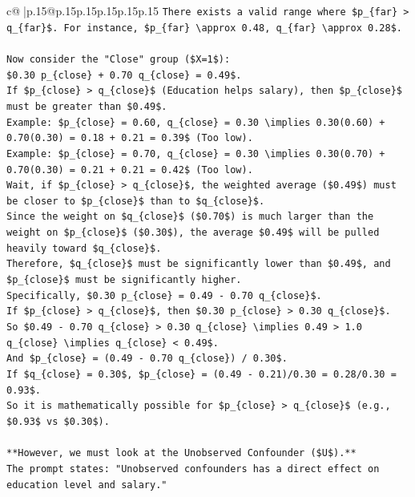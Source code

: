 \documentclass{article}
\begin{document}
{\begin{supertabular}{c@{$\;$}|p{.15\linewidth}@{}p{.15\linewidth}p{.15\linewidth}p{.15\linewidth}p{.15\linewidth}p{.15\linewidth}}
{{{\texttt{There exists a valid range where \$p\_\{far\} > q\_\{far\}\$. For instance, \$p\_\{far\} \textbackslash{}approx 0.48, q\_\{far\} \textbackslash{}approx 0.28\$.} \\
\\ 
\texttt{Now consider the "Close" group (\$X=1\$):} \\
\texttt{\$0.30 p\_\{close\} + 0.70 q\_\{close\} = 0.49\$.} \\
\texttt{If \$p\_\{close\} > q\_\{close\}\$ (Education helps salary), then \$p\_\{close\}\$ must be greater than \$0.49\$.} \\
\texttt{Example: \$p\_\{close\} = 0.60, q\_\{close\} = 0.30 \textbackslash{}implies 0.30(0.60) + 0.70(0.30) = 0.18 + 0.21 = 0.39\$ (Too low).} \\
\texttt{Example: \$p\_\{close\} = 0.70, q\_\{close\} = 0.30 \textbackslash{}implies 0.30(0.70) + 0.70(0.30) = 0.21 + 0.21 = 0.42\$ (Too low).} \\
\texttt{Wait, if \$p\_\{close\} > q\_\{close\}\$, the weighted average (\$0.49\$) must be closer to \$p\_\{close\}\$ than to \$q\_\{close\}\$.} \\
\texttt{Since the weight on \$q\_\{close\}\$ (\$0.70\$) is much larger than the weight on \$p\_\{close\}\$ (\$0.30\$), the average \$0.49\$ will be pulled heavily toward \$q\_\{close\}\$.} \\
\texttt{Therefore, \$q\_\{close\}\$ must be significantly lower than \$0.49\$, and \$p\_\{close\}\$ must be significantly higher.} \\
\texttt{Specifically, \$0.30 p\_\{close\} = 0.49 {-} 0.70 q\_\{close\}\$.} \\
\texttt{If \$p\_\{close\} > q\_\{close\}\$, then \$0.30 p\_\{close\} > 0.30 q\_\{close\}\$.} \\
\texttt{So \$0.49 {-} 0.70 q\_\{close\} > 0.30 q\_\{close\} \textbackslash{}implies 0.49 > 1.0 q\_\{close\} \textbackslash{}implies q\_\{close\} < 0.49\$.} \\
\texttt{And \$p\_\{close\} = (0.49 {-} 0.70 q\_\{close\}) / 0.30\$.} \\
\texttt{If \$q\_\{close\} = 0.30\$, \$p\_\{close\} = (0.49 {-} 0.21)/0.30 = 0.28/0.30 = 0.93\$.} \\
\texttt{So it is mathematically possible for \$p\_\{close\} > q\_\{close\}\$ (e.g., \$0.93\$ vs \$0.30\$).} \\
\\ 
\texttt{**However, we must look at the Unobserved Confounder (\$U\$).**} \\
\texttt{The prompt states: "Unobserved confounders has a direct effect on education level and salary."} \\
}}}
\end{supertabular}}
\end{document}
